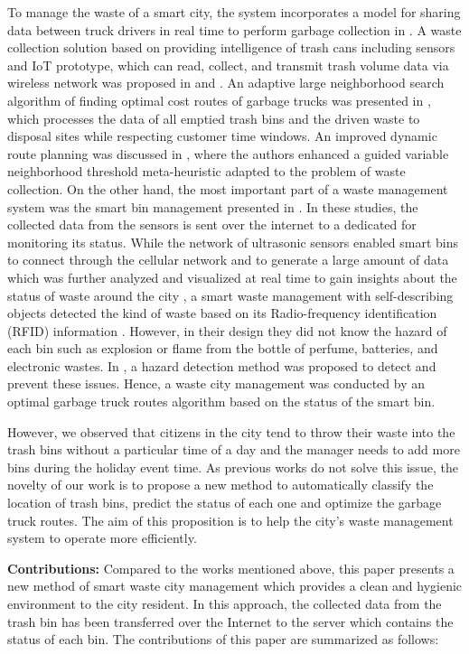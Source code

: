 \documentclass[conference]{IEEEtran}
\begin{document}
To manage the waste of a smart city, the system incorporates a model for sharing data between truck drivers in real time to perform garbage collection in \cite{Medvedev2015}. A waste collection solution based on providing intelligence of trash cans including sensors and IoT prototype, which can read, collect, and transmit trash volume data via wireless network was proposed in \cite{Gutierreza2015} and \cite{Hong2014}. An adaptive large neighborhood search algorithm of finding optimal cost routes of garbage trucks was presented in \cite{Buhrkala212}, which processes the data of all emptied trash bins and the driven waste to disposal sites while respecting customer time windows. An improved dynamic route planning was discussed in \cite{Nuorito2006}, where the authors enhanced a guided variable neighborhood threshold meta-heuristic adapted to the problem of waste collection. On the other hand, the most important part of a waste management system was the smart bin management presented in  \cite{Sharma2015,Glouche2013,Sinhan2013}. In these studies, the collected data  from the sensors is sent over the internet to a dedicated  for monitoring its status. While the network of ultrasonic sensors enabled smart bins to connect through the cellular network and to generate a large amount of data which was further analyzed and visualized at real time to gain insights about the status of waste around the city \cite{Sharma2015}, a smart waste management with self-describing objects detected the kind of waste based on its Radio-frequency identification (RFID) information \cite{Glouche2013}. However, in their design they did not know the hazard of each bin such as explosion or flame from the bottle of perfume, batteries, and electronic wastes. In \cite{Sinhan2013}, a hazard detection method was proposed to detect and prevent these issues. Hence, a waste city management was conducted by an optimal garbage truck routes algorithm based on the status of the smart bin. 

However, we observed that citizens in the city tend to throw their waste into the trash bins without a particular time of a day and the manager needs to add more bins during the holiday event time. As previous works do not solve this issue, the novelty of our work is to propose a new method to automatically classify the location of trash bins, predict the status of each one and optimize the garbage truck routes. The aim of this proposition is to help the city's waste management system to operate more efficiently. 

\par\textbf{Contributions:} 
Compared to the works mentioned above, this paper presents a new method of smart waste city management which provides a clean and hygienic environment to the city resident. In this approach, the collected data from the trash bin has been transferred over the Internet to the server which contains the status of each bin. The contributions of this paper are summarized as follows:
\end{document}
